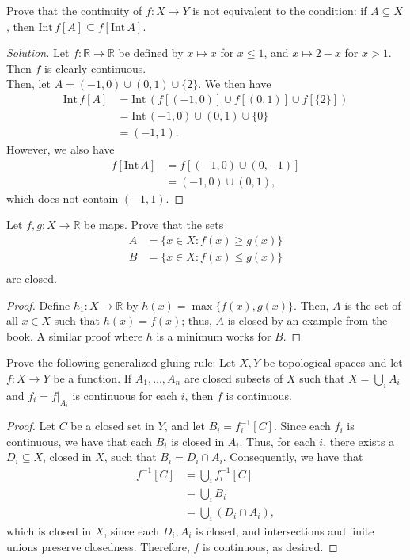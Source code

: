 \documentclass[12pt]{article}
\newenvironment{problem}[2][Problem]{\begin{trivlist}
\item[\hskip \labelsep {\bfseries #1}\hskip \labelsep {\bfseries #2.}]}{\end{trivlist}}
\newcommand{\Int}[1]{\text{Int}\,#1}
\newcommand{\R}{\mathbb{R}}
\newenvironment{solution}
  {\renewcommand\qedsymbol{$\blacksquare$}\begin{proof}[Solution]}
{\end{proof}}
\begin{document}
\newpage

\begin{problem}{6.7}
  Prove that the continuity of $f:X\to Y$ is not equivalent to the condition:
  if $A\subseteq X$, then $\Int f[A]\subseteq f[\Int A]$.
\end{problem}
\begin{solution}
  Let $f:\R\to\R$ be defined by $x\mapsto x$ for $x\leq 1$, and 
  $x\mapsto 2-x$ for $x>1$.
  Then $f$ is clearly continuous. \\
  \indent Then, let $A=(-1,0)\cup(0,1)\cup\{2\}$.
  We then have
  \begin{align*}
    \Int f[A] &= \Int(f[(-1,0)]\cup f[(0,1)]\cup f[\{2\}]) \\
    &= \Int(-1,0)\cup(0,1)\cup\{0\} \\
    &= (-1,1).
  \end{align*}
  However, we also have
  \begin{align*}
    f[\Int A] &= f[(-1,0)\cup(0,-1)]\\
    &= (-1,0)\cup(0,1),
  \end{align*}
  which does not contain $(-1,1)$.
\end{solution}

\begin{problem}{6.9}
  Let $f,g:X\to\R$ be maps.
  Prove that the sets
  \begin{align*}
    A&=\{x\in X:f(x)\geq g(x)\}\\
    B&=\{x\in X:f(x)\leq g(x)\}\\
  \end{align*}
  are closed.
\end{problem}
\begin{proof}
  Define $h_1:X\to\R$ by $h(x) = \max\{f(x),g(x)\}$.
  Then, $A$ is the set of all $x\in X$ such that $h(x)=f(x)$;
  thus, $A$ is closed by an example from the book.
  A similar proof where $h$ is a minimum works for $B$.
\end{proof}

\begin{problem}{6.10}
  Prove the following generalized gluing rule: 
  Let $X,Y$ be topological spaces and let $f:X\to Y$ be a function.
  If $A_1,\dots,A_n$ are closed subsets of $X$ such that
  $X=\bigcup_i A_i$ and $f_i = f|_{A_i}$ is continuous for each $i$,
  then $f$ is continuous.
\end{problem}
\begin{proof}
  Let $C$ be a closed set in $Y$, and let $B_i = f_i^{-1}[C]$.
  Since each $f_i$ is continuous, we have that each $B_i$ is closed in $A_i$.
  Thus, for each $i$, there exists a $D_i\subseteq X$, closed in $X$, such
  that $B_i=D_i\cap A_i$.
  Consequently, we have that
  \begin{align*}
    f^{-1}[C] &= \bigcup_if_i^{-1}[C] \\
    &= \bigcup_iB_i \\
    &= \bigcup_i(D_i\cap A_i),
  \end{align*}
  which is closed in $X$, since each $D_i,A_i$ is closed, and intersections
  and finite unions preserve closedness.
  Therefore, $f$ is continuous, as desired.
\end{proof}
\end{document}
